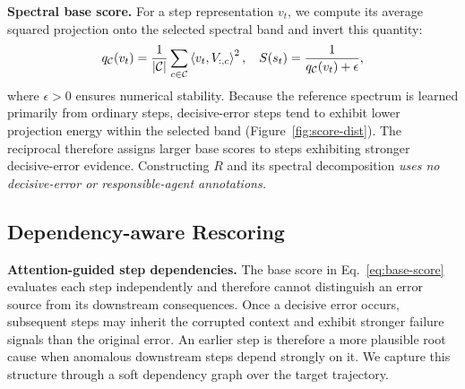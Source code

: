 \textbf{Spectral base score.}
For a step representation $v_t$, we compute its average squared projection
onto the selected spectral band and invert this quantity:
\begin{equation}
\small
    q_{\mathcal{C}}(v_t)
    =
    \frac{1}{|\mathcal{C}|}
    \sum_{c\in\mathcal{C}}
    \left\langle v_t,V_{:,c}\right\rangle^2,\quad
    S(s_t)
    =
    \frac{1}{q_{\mathcal{C}}(v_t)+\epsilon},
\label{eq:base-score}
\end{equation}
where $\epsilon>0$ ensures numerical stability.
Because the reference spectrum is learned primarily from ordinary steps,
decisive-error steps tend to exhibit lower projection energy within the
selected band
(Figure~\ref{fig:score-dist}).
The reciprocal therefore assigns larger base scores to steps exhibiting
stronger decisive-error evidence.
Constructing $R$ and its spectral decomposition \textit{uses no decisive-error or
responsible-agent annotations.}






\subsection{Dependency-aware Rescoring}
\label{sec:method:weights}

\textbf{Attention-guided step dependencies.} The base score in Eq.~\ref{eq:base-score} evaluates each step independently
and therefore cannot distinguish an error source from its downstream
consequences.
Once a decisive error occurs, subsequent steps may inherit the corrupted
context and exhibit stronger failure signals than the original error.
An earlier step is therefore a more plausible root cause when anomalous
downstream steps depend strongly on it.
We capture this structure through a soft dependency graph over the target
trajectory.

